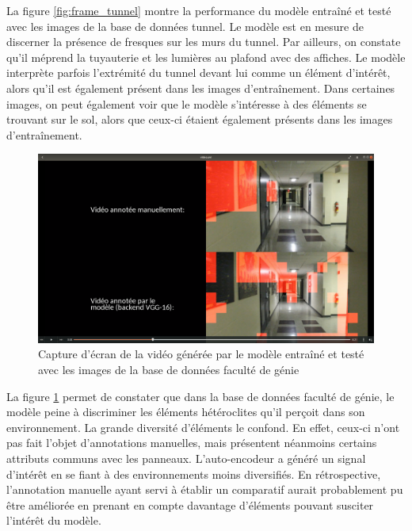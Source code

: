     La figure \ref{fig:frame_tunnel} montre la performance du modèle entraîné et testé avec les images de la base de données tunnel. Le modèle est en mesure de discerner la présence de fresques sur les murs du tunnel. Par ailleurs, on constate qu'il méprend la tuyauterie et les lumières au plafond avec des affiches. Le modèle interprète parfois l'extrémité du tunnel devant lui comme un élément d'intérêt, alors qu'il est également présent dans les images d'entraînement. Dans certaines images, on peut également voir que le modèle s’intéresse à des éléments se trouvant sur le sol, alors que ceux-ci étaient également présents dans les images d'entraînement.\\

    \begin{figure}
        \centering
        \includegraphics[width=17cm]{images/frame_corridor.png}
        \caption{Capture d'écran de la vidéo générée par le modèle entraîné et testé avec les images de la base de données faculté de génie}
        \label{fig:frame_corridor}
    \end{figure}

    La figure \ref{fig:frame_corridor} permet de constater que dans la base de données faculté de génie, le modèle peine à discriminer les éléments hétéroclites qu'il perçoit dans son environnement. La grande diversité d'éléments le confond. En effet, ceux-ci n'ont pas fait l'objet d'annotations manuelles, mais présentent néanmoins certains attributs communs avec les panneaux. L'auto-encodeur a généré un signal d’intérêt en se fiant à des environnements moins diversifiés. En rétrospective, l'annotation manuelle ayant servi à établir un comparatif aurait probablement pu être améliorée en prenant en compte davantage d'éléments pouvant susciter l’intérêt du modèle.\\


